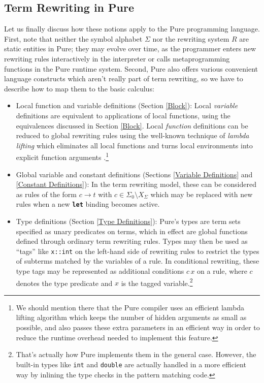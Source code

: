 \documentclass[a4paper,12pt]{article}
\newcommand{\kw}[1]{\texttt{\textbf{#1}}}
\begin{document}
\subsection{Term Rewriting in Pure}

Let us finally discuss how these notions apply to the Pure programming language. First, note that neither the symbol alphabet $\Sigma$ nor the rewriting system $R$ are static entities in Pure; they may evolve over time, as the programmer enters new rewriting rules interactively in the interpreter or calls metaprogramming functions in the Pure runtime system. Second, Pure also offers various convenient language constructs which aren't really part of term rewriting, so we have to describe how to map them to the basic calculus:

\begin{itemize}
\item Local function and variable definitions (Section \ref{Block}): Local \emph{variable} definitions are equivalent to applications of local functions, using the equivalences discussed in Section \ref{Block}. Local \emph{function} definitions can be reduced to global rewriting rules using the well-known technique of \emph{lambda lifting} which eliminates all local functions and turns local environments into explicit function arguments \cite{Johnsson85}.\footnote{We should mention there that the Pure compiler uses an efficient lambda lifting algorithm which keeps the number of hidden arguments as small as possible, and also passes these extra parameters in an efficient way in order to reduce the runtime overhead needed to implement this feature.}
\item Global variable and constant definitions (Sections \ref{Variable Definitions} and \ref{Constant Definitions}): In the term rewriting model, these can be considered as rules of the form $c\rightarrow t$ with $c\in\Sigma_0\setminus X_\Sigma$ which may be replaced with new rules when a new \kw{let} binding becomes active.
\item Type definitions (Section \ref{Type Definitions}): Pure's types are term sets specified as unary predicates on terms, which in effect are global functions defined through ordinary term rewriting rules. Types may then be used as ``tags'' like \verb|x::int| on the left-hand side of rewriting rules to restrict the types of subterms matched by the variables of a rule. In conditional rewriting, these type tags may be represented as additional conditions $c\, x$ on a rule, where $c$ denotes the type predicate and $x$ is the tagged variable.\footnote{That's actually how Pure implements them in the general case. However, the built-in types like \texttt{int} and \texttt{double} are actually handled in a more efficient way by inlining the type checks in the pattern matching code.}

\end{itemize}
\end{document}
